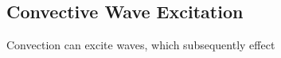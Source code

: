{\color{purple}
\subsection{Convective Wave Excitation}
}

Convection can excite waves, which subsequently effect 
